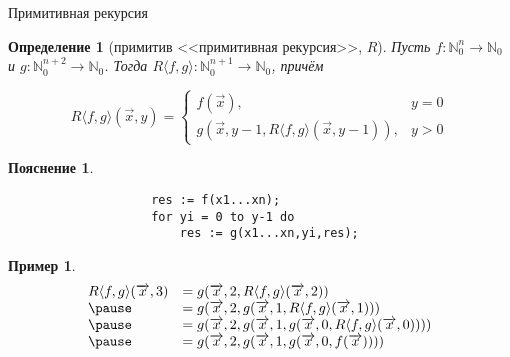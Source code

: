 \documentclass[handout]{beamer}
\newtheorem{dfn}{Определение}[section]
\newtheorem{exm}{Пример}[section]
\newtheorem{snote}{Пояснение}[section]
\begin{document}
\begin{frame}[fragile]{Примитивная рекурсия}
\begin{dfn}[примитив <<примитивная рекурсия>>, $R$]
Пусть $f: \mathbb{N}^n_0\to\mathbb{N}_0$ и $g: \mathbb{N}^{n+2}_0 \to\mathbb{N}_0$.
Тогда $R\langle f,g\rangle: \mathbb{N}^{n+1}_0\to\mathbb{N}_0$, причём

$$R\langle f,g\rangle(\overrightarrow{x},y)=
 \left\{\begin{array}{ll} 
  f(\overrightarrow{x}), &y=0\\
  g(\overrightarrow{x},y-1,R\langle f,g\rangle (\overrightarrow{x},y-1)), &y > 0
\end{array}\right.$$
\end{dfn}\pause

\vspace{-0.3cm}
\begin{snote}\vspace{-0.5cm}
\begin{verbatim}
                    res := f(x1...xn);
                    for yi = 0 to y-1 do
                        res := g(x1...xn,yi,res);
\end{verbatim}
\end{snote}\pause

\vspace{-0.3cm}
\begin{exm}\vspace{-0.5cm}
$$\begin{array}{ll}
    R\langle f,g\rangle(\overrightarrow{x},3) &= g(\overrightarrow{x},2,R\langle f,g\rangle(\overrightarrow{x},2)) \\\pause
 &=   g(\overrightarrow{x},2,g(\overrightarrow{x},1,R\langle f,g\rangle(\overrightarrow{x},1))) \\\pause
 &=   g(\overrightarrow{x},2,g(\overrightarrow{x},1,g(\overrightarrow{x},0,R\langle f,g\rangle(\overrightarrow{x},0)))) \\\pause
 &=  g(\overrightarrow{x},2,g(\overrightarrow{x},1,g(\overrightarrow{x},0,f(\overrightarrow{x}))))
\end{array}$$
\end{exm}


\end{frame}
\end{document}
